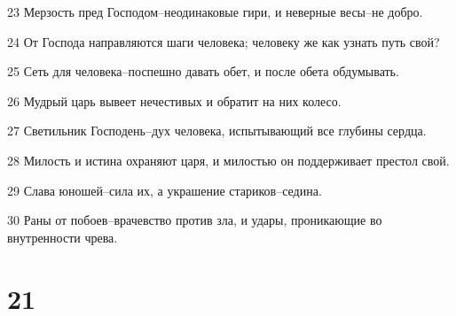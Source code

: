 \par 23 Мерзость пред Господом--неодинаковые гири, и неверные весы--не добро.
\par 24 От Господа направляются шаги человека; человеку же как узнать путь свой?
\par 25 Сеть для человека--поспешно давать обет, и после обета обдумывать.
\par 26 Мудрый царь вывеет нечестивых и обратит на них колесо.
\par 27 Светильник Господень--дух человека, испытывающий все глубины сердца.
\par 28 Милость и истина охраняют царя, и милостью он поддерживает престол свой.
\par 29 Слава юношей--сила их, а украшение стариков--седина.
\par 30 Раны от побоев--врачевство против зла, и удары, проникающие во внутренности чрева.

\chapter{21}

